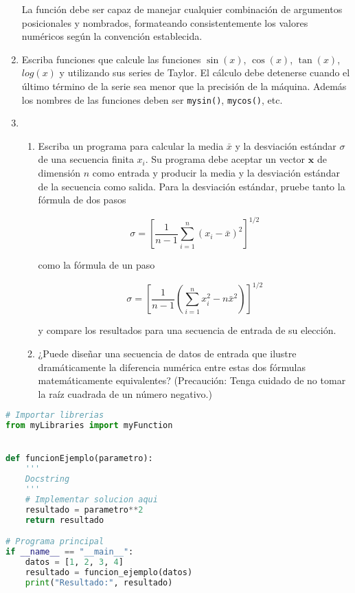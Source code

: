 \documentclass[12pt]{article}
\begin{document}
\begin{enumerate}[label=\textbf{\arabic*.}]
La función debe ser capaz de manejar cualquier combinación de argumentos posicionales y nombrados, formateando consistentemente los valores numéricos según la convención establecida.


  \item   
  Escriba funciones que calcule las funciones $\sin(x)$, $\cos(x)$, $\tan(x)$, $log(x)$ y   utilizando sus series de Taylor.  
  El cálculo debe detenerse cuando el último término de la serie sea menor que la precisión de la máquina. Además los nombres de las funciones deben ser \texttt{mysin()}, \texttt{mycos()}, etc.
  
\item 
\begin{enumerate}
\item Escriba un programa para calcular la media \(\bar{x}\) y la desviación estándar \(\sigma\) de una secuencia finita \(x_i\). Su programa debe aceptar un vector \(\mathbf{x}\) de dimensión \(n\) como entrada y producir la media y la desviación estándar de la secuencia como salida. Para la desviación estándar, pruebe tanto la fórmula de dos pasos

\[
\sigma = \left[ \frac{1}{n-1} \sum_{i=1}^{n} (x_i - \bar{x})^2 \right]^{1/2}
\]

como la fórmula de un paso

\[
\sigma = \left[ \frac{1}{n-1} \left( \sum_{i=1}^{n} x_i^2 - n\bar{x}^2 \right) \right]^{1/2}
\]

y compare los resultados para una secuencia de entrada de su elección.

\item ¿Puede diseñar una secuencia de datos de entrada que ilustre dramáticamente la diferencia numérica entre estas dos fórmulas matemáticamente equivalentes? (Precaución: Tenga cuidado de no tomar la raíz cuadrada de un número negativo.)

\end{enumerate}
\end{enumerate}
\begin{lstlisting}[language=Python, caption=Ejemplo de estructura en Python]
# Importar librerias
from myLibraries import myFunction


def funcionEjemplo(parametro):
    '''
    Docstring
    '''
    # Implementar solucion aqui
    resultado = parametro**2
    return resultado

# Programa principal
if __name__ == "__main__":
    datos = [1, 2, 3, 4]
    resultado = funcion_ejemplo(datos)
    print("Resultado:", resultado)
\end{lstlisting}
\end{document}
